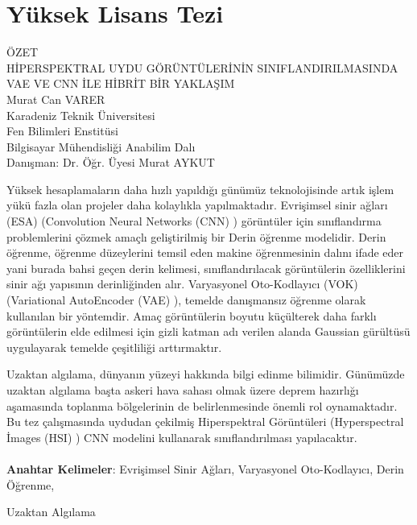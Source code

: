 \chapter*{\normalfont Yüksek Lisans Tezi}


\begin{center}
\vspace{-1.2cm}
    ÖZET\\
    \vspace{0.33cm}
    HİPERSPEKTRAL UYDU GÖRÜNTÜLERİNİN SINIFLANDIRILMASINDA\\ VAE VE CNN İLE HİBRİT BİR YAKLAŞIM\\
    \vspace{0.33cm}
    Murat Can VARER\\
    \vspace{0.33cm}
    Karadeniz Teknik Üniversitesi\\
    Fen Bilimleri Enstitüsi\\
    Bilgisayar Mühendisliği Anabilim Dalı\\
    Danışman: Dr. Öğr. Üyesi Murat AYKUT
\end{center}
\vspace{0.5cm}
\hspace{0.8cm} Yüksek hesaplamaların daha hızlı yapıldığı günümüz teknolojisinde artık işlem yükü fazla olan projeler daha kolaylıkla yapılmaktadır. Evrişimsel sinir ağları (ESA) (Convolution Neural Networks (CNN) ) görüntüler için sınıflandırma problemlerini çözmek amaçlı geliştirilmiş bir Derin öğrenme modelidir.
Derin öğrenme, öğrenme düzeylerini temsil eden makine öğrenmesinin dalını ifade eder yani burada bahsi geçen derin kelimesi, sınıflandırılacak görüntülerin özelliklerini sinir ağı yapısının derinliğinden alır. Varyasyonel Oto-Kodlayıcı (VOK) (Variational AutoEncoder (VAE) ), temelde danışmansız öğrenme olarak kullanılan bir yöntemdir. Amaç görüntülerin boyutu küçülterek daha farklı görüntülerin elde edilmesi için gizli katman adı verilen alanda Gaussian gürültüsü uygulayarak temelde çeşitliliği arttırmaktır. 

Uzaktan algılama, dünyanın yüzeyi hakkında bilgi edinme bilimidir. Günümüzde uzaktan algılama başta askeri hava sahası olmak üzere deprem hazırlığı aşamasında toplanma bölgelerinin de belirlenmesinde önemli rol oynamaktadır. Bu tez çalışmasında uydudan çekilmiş Hiperspektral Görüntüleri (Hyperspectral İmages (HSI) ) CNN modelini kullanarak sınıflandırılması yapılacaktır.
\\
\\
\textbf{Anahtar Kelimeler}: Evrişimsel Sinir Ağları, Varyasyonel Oto-Kodlayıcı, Derin Öğrenme, 

                            \hspace{2.7cm}Uzaktan Algılama

